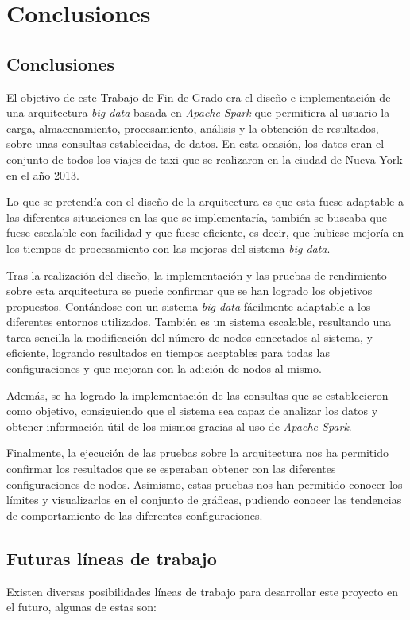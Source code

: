 \chapter{Conclusiones\label{sec:conclusiones}}

\section{Conclusiones}
El objetivo de este Trabajo de Fin de Grado era el diseño e implementación de una arquitectura \textit{big data} basada en \textit{Apache Spark} que permitiera al usuario la carga, almacenamiento, procesamiento, análisis y la obtención de resultados, sobre unas consultas establecidas, de datos. En esta ocasión, los datos eran el conjunto de todos los viajes de taxi que se realizaron en la ciudad de Nueva York en el año 2013.

Lo que se pretendía con el diseño de la arquitectura es que esta fuese adaptable a las diferentes situaciones en las que se implementaría, también se buscaba que fuese escalable con facilidad y que fuese eficiente, es decir, que hubiese mejoría en los tiempos de procesamiento con las mejoras del sistema \textit{big data}.

Tras la realización del diseño, la implementación y las pruebas de rendimiento sobre esta arquitectura se puede confirmar que se han logrado los objetivos propuestos. Contándose con un sistema \textit{big data} fácilmente adaptable a los diferentes entornos utilizados. También es un sistema escalable, resultando una tarea sencilla la modificación del número de nodos conectados al sistema, y eficiente, logrando resultados en tiempos aceptables para todas las configuraciones y que mejoran con la adición de nodos al mismo.

Además, se ha logrado la implementación de las consultas que se establecieron como objetivo, consiguiendo que el sistema sea capaz de analizar los datos y obtener información útil de los mismos gracias al uso de \textit{Apache Spark}.

Finalmente, la ejecución de las pruebas sobre la arquitectura nos ha permitido confirmar los resultados que se esperaban obtener con las diferentes configuraciones de nodos. Asimismo, estas pruebas nos han permitido conocer los límites y visualizarlos en el conjunto de gráficas, pudiendo conocer las tendencias de comportamiento de las diferentes configuraciones.

\section{Futuras líneas de trabajo}
Existen diversas posibilidades líneas de trabajo para desarrollar este proyecto en el futuro, algunas de estas son:

